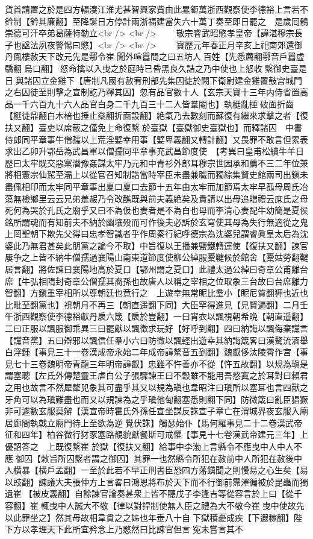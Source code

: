 貨首請置之於是四方輻湊江淮尤甚智興家貲由此累鉅萬浙西觀察使李德裕上言若不鈐制【鈐其廉翻】至降誕日方停計兩浙福建當失六十萬丁奏至即日罷之　是歲囘鶻崇德可汗卒弟曷薩特勒立<br />
<br />
　　敬宗睿武昭愍孝皇帝【諱湛穆宗長子也諡法夙夜警惕曰愍】<br />
<br />
　　寶歷元年春正月辛亥上祀南郊還御丹鳳樓赦天下改元先是鄠令崔聞外喧囂問之曰五坊人百姓【先悉薦翻鄠音戶囂虚驕翻烏口翻】怒命擒以入曳之於庭時已昏黑良久詰之乃中使也上怒收繫御史臺是日與諸囚立金雞下【唐制凡國有赦宥刑部先集囚徒於闕下衛尉建金雞置鼓宫城門之右囚徒至則擊之宣制訖乃釋其囚】忽有品官數十人【玄宗天寶十三年内侍省置高品一千六百九十六人品官白身二千九百三十二人皆羣閹也】執梃亂捶破面折齒【梃徒鼎翻白木棓也捶止橤翻折面設翻】絶氣乃去數刻而蘇復有繼來求擊之者【復扶又翻】臺吏以席蔽之僅免上命復繫於臺獄【臺獄御史臺獄也】而釋諸囚　中書侍郎同平章事牛僧孺以上荒淫嬖幸用事【嬖卑義翻又轉計翻】又畏罪不敢言但累表求出乙卯升鄂岳為武昌軍以僧孺同平章事充武昌節度使　【考異曰皇甫松續牛羊日歷曰太牢既交惡黨潛豫姦謀太牢乃元和中青衫外郎耳穆宗世因承和薦不三二年位兼將相憲宗仙駕至灞上以從官召知制誥當時宰臣未盡兼職而獨綜集賢史館兩司出鎭未盡佩相印而太牢同平章事出夏口夏口去節十五年由太牢而加節焉太牢早孤母周氏冶蕩無檢鄉里云云兄弟羞赧乃令改醮既與前夫義絶矣及貴請以出母追贈禮云庶氏之母死何為哭於孔氏之廟乎又曰不為伋也妻者是不為白也母而李清心妻配牛幼簡是夏侯銘所謂魂而有知前夫不納於幽壤殁而可作後夫必訴於玄穹使其母為失行無適從之鬼上罔聖朝下欺先父得曰忠孝智識者乎作周秦行紀呼德宗為沈婆兒謂睿眞皇太后為沈婆此乃無君甚矣此朋黨之論今不取】中旨復以王播兼鹽鐵轉運使【復扶又翻】諫官屢争之上皆不納牛僧孺過襄陽山南東道節度使柳公綽服櫜鞬候於館舍【櫜姑勞翻鞬居言翻】將佐諫曰襄陽地高於夏口【鄂州謂之夏口】此禮太過公綽曰奇章公甫離台席【牛弘相隋封奇章公僧孺其裔孫也故唐人以稱之宰相之位取象三台故曰台席離力智翻】方鎭重宰相所以尊朝廷也竟行之　上遊幸無常眤比羣小【眤尼質翻狎也近也比毗至翻黨也】視朝月不再三【朝直遥翻下同】大臣罕得進見【見賢遍翻】二月壬午浙西觀察使李德裕獻丹扆六箴【扆於豈翻】一曰宵衣以諷視朝希晩【朝直遥翻】二曰正服以諷服御乖異三曰罷獻以諷徵求玩好【好呼到翻】四曰納誨以諷侮棄讜言【讜音黨】五曰辯邪以諷信任羣小六曰防微以諷輕出遊幸其納誨箴畧曰漢驁流湎舉白浮鍾【事見三十一卷漢成帝永始二年成帝諱驁音五到翻】魏叡侈汰陵霄作宫【事見七十三卷魏明帝青龍三年明帝諱叡】忠雖不忤善亦不從【忤五故翻】以規為瑱是謂塞聰【左氏外傳楚靈王虐白公子張驟諫王曰不穀雖不能用吾憗寘之於耳對曰賴君之用也故言不然犀犛兕象其可盡乎其又以規為瑱也韋昭注曰瑱所以塞耳也言四獸之牙角可以為瑱難盡也而又以規諫為之乎瑱他甸翻塞悉則翻下同】防微箴曰亂臣猖獗非可遽數玄服莫辯【漢宣帝時霍氏外孫任宣坐謀反誅宣子章亡在渭城界夜玄服入廟居廊間執戟立廟門待上至欲為逆覺伏誅】觸瑟始仆【馬何羅事見二十二卷漢武帝征和四年】柏谷微行犲豕塞路覩貌獻餐斯可戒懼【事見十七卷漢武帝建元三年】上優詔答之　上既復繫崔於獄【復扶又翻】給事中李渤上言縣令不應曳中人中人不應御囚【敕旨所囚繫者謂之御囚】其罪一也然縣令所犯在赦前中人所犯在赦後中人横暴【横戶孟翻】一至於此若不早正刑書臣恐四方藩鎭聞之則慢易之心生矣【易以豉翻】諫議大夫張仲方上言畧曰鴻恩將布於天下而不行御前霈澤徧被於昆蟲而獨遺崔【被皮義翻】自餘諫官論奏甚衆上皆不聽戊子李逢吉等從容言於上曰【從千容翻】崔輒曳中人誠大不敬【律以對捍制使無人臣之禮為大不敬今崔曳中使故先以此罪坐之】然其母故相韋貫之之姊也年垂八十自下獄積憂成疾【下遐稼翻】陛下方以孝理天下此所宜矜念上乃愍然曰比諫官但言寃未嘗言其不